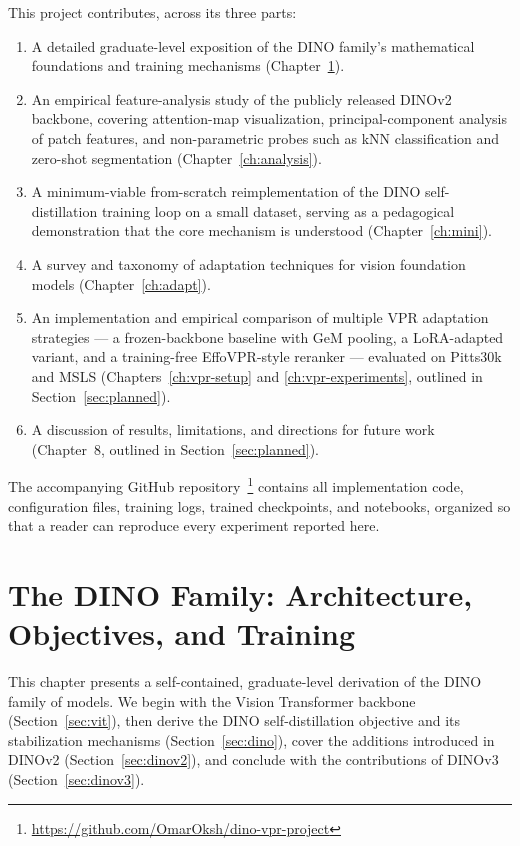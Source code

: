 \documentclass[11pt,a4paper]{article}
\begin{document}
This project contributes, across its three parts:

\begin{enumerate}[leftmargin=*,label=(\arabic*)]
  \item A detailed graduate-level exposition of the DINO family's
  mathematical foundations and training mechanisms
  (Chapter~\ref{ch:dino}).
  \item An empirical feature-analysis study of the publicly released DINOv2
  backbone, covering attention-map visualization, principal-component
  analysis of patch features, and non-parametric probes such as kNN
  classification and zero-shot segmentation
  (Chapter~\ref{ch:analysis}).
  \item A minimum-viable from-scratch reimplementation of the DINO
  self-distillation training loop on a small dataset, serving as a
  pedagogical demonstration that the core mechanism is understood
  (Chapter~\ref{ch:mini}).
  \item A survey and taxonomy of adaptation techniques for vision
  foundation models (Chapter~\ref{ch:adapt}).
  \item An implementation and empirical comparison of multiple VPR
  adaptation strategies --- a frozen-backbone baseline with GeM pooling,
  a LoRA-adapted variant, and a training-free EffoVPR-style reranker ---
  evaluated on Pitts30k and MSLS (Chapters~\ref{ch:vpr-setup} and
  \ref{ch:vpr-experiments}, outlined in Section~\ref{sec:planned}).
  \item A discussion of results, limitations, and directions for future
  work (Chapter~8, outlined in Section~\ref{sec:planned}).
\end{enumerate}

The accompanying GitHub repository~\footnote{\url{https://github.com/OmarOksh/dino-vpr-project}}
contains all implementation code, configuration files, training logs,
trained checkpoints, and notebooks, organized so that a reader can
reproduce every experiment reported here.

\newpage
\section{The DINO Family: Architecture, Objectives, and Training}
\label{ch:dino}

This chapter presents a self-contained, graduate-level derivation of the
DINO family of models. We begin with the Vision Transformer backbone
(Section~\ref{sec:vit}), then derive the DINO self-distillation objective
and its stabilization mechanisms (Section~\ref{sec:dino}), cover the
additions introduced in DINOv2 (Section~\ref{sec:dinov2}), and conclude
with the contributions of DINOv3 (Section~\ref{sec:dinov3}).
\end{document}
